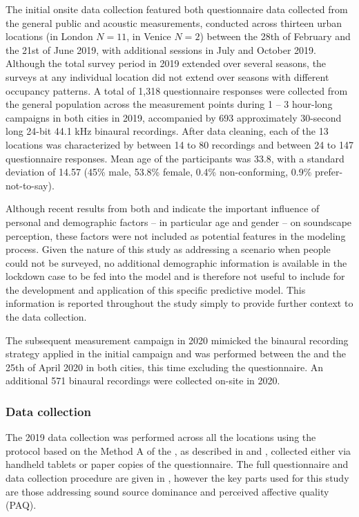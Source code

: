 \documentclass[
  authoryear,
  preprint,
  3p,
  onecolumn]{elsarticle}
\begin{document}
The initial onsite data collection featured both questionnaire data
collected from the general public and acoustic measurements, conducted
across thirteen urban locations (in London \(N=11\), in Venice \(N=2\))
between the 28th of February and the 21st of June 2019, with additional
sessions in July and October 2019. Although the total survey period in
2019 extended over several seasons, the surveys at any individual
location did not extend over seasons with different occupancy patterns.
A total of 1,318 questionnaire responses were collected from the general
population across the measurement points during 1 -- 3 hour-long
campaigns in both cities in 2019, accompanied by 693 approximately
30-second long 24-bit 44.1 kHz binaural recordings. After data cleaning,
each of the 13 locations was characterized by between 14 to 80
recordings and between 24 to 147 questionnaire responses. Mean age of
the participants was 33.8, with a standard deviation of 14.57 (45\%
male, 53.8\% female, 0.4\% non-conforming, 0.9\% prefer-not-to-say).

Although recent results from both \citet{Tarlao2020Investigating} and
\citet{Erfanian2021Psychological} indicate the important influence of
personal and demographic factors -- in particular age and gender -- on
soundscape perception, these factors were not included as potential
features in the modeling process. Given the nature of this study as
addressing a scenario when people could not be surveyed, no additional
demographic information is available in the lockdown case to be fed into
the model and is therefore not useful to include for the development and
application of this specific predictive model. This information is
reported throughout the study simply to provide further context to the
data collection.

The subsequent measurement campaign in 2020 mimicked the binaural
recording strategy applied in the initial campaign and was performed
between the  and the 25th of April 2020 in both cities, this time
excluding the questionnaire. An additional 571 binaural recordings were
collected on-site in 2020.

\hypertarget{data-collection}{%
\subsubsection{Data collection}\label{data-collection}}

The 2019 data collection was performed across all the locations using
the protocol based on the Method A of the \citet{ISO12913Part2}, as
described in \citet{Aletta2020Assessing} and
\citet{Mitchell2020Soundscape}, collected either via handheld tablets or
paper copies of the questionnaire. The full questionnaire and data
collection procedure are given in \citet{Mitchell2020Soundscape},
however the key parts used for this study are those addressing sound
source dominance and perceived affective quality (PAQ).
\end{document}
